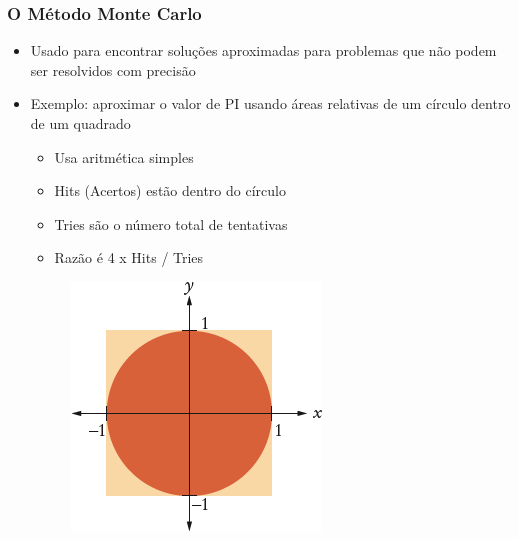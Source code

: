\documentclass[xcolor={dvipsnames,table},aspectratio=169]{beamer}
\begin{document}
\begin{frame}\frametitle{O Método Monte Carlo}
\begin{itemize}
	\item Usado para encontrar soluções aproximadas para problemas que não podem ser resolvidos com precisão
	\item Exemplo: aproximar o valor de PI usando áreas relativas de um círculo dentro de um quadrado
	\begin{itemize}
		\item Usa aritmética simples
		\item Hits (Acertos) estão dentro do círculo
		\item Tries são o número total de tentativas
		\item Razão é 4 x Hits / Tries
	\end{itemize}
\begin{figure}[h]
	\includegraphics[height=0.2\paperheight,center]{pucrs-ep-fprog-unidade_04-lacos-laminas-monte_carlo.png}
\end{figure}
\end{itemize}
\end{frame}
\end{document}
